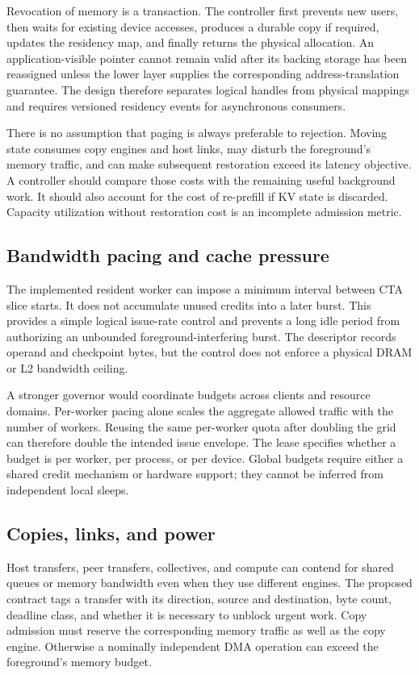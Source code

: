 Revocation of memory is a transaction. The controller first prevents new
users, then waits for existing device accesses, produces a durable copy if
required, updates the residency map, and finally returns the physical
allocation. An application-visible pointer cannot remain valid after its
backing storage has been reassigned unless the lower layer supplies the
corresponding address-translation guarantee. The design therefore separates
logical handles from physical mappings and requires versioned residency
events for asynchronous consumers.

There is no assumption that paging is always preferable to rejection. Moving
state consumes copy engines and host links, may disturb the foreground's
memory traffic, and can make subsequent restoration exceed its latency
objective. A controller should compare those costs with the remaining useful
background work. It should also account for the cost of re-prefill if KV
state is discarded. Capacity utilization without restoration cost is an
incomplete admission metric.

\subsection{Bandwidth pacing and cache pressure}
The implemented resident worker can impose a minimum interval between CTA
slice starts. It does not accumulate unused credits into a later burst. This
provides a simple logical issue-rate control and prevents a long idle period
from authorizing an unbounded foreground-interfering burst. The descriptor
records operand and checkpoint bytes, but the control does not enforce a
physical DRAM or L2 bandwidth ceiling.

A stronger governor would coordinate budgets across clients and resource
domains. Per-worker pacing alone scales the aggregate allowed traffic with
the number of workers. Reusing the same per-worker quota after doubling the
grid can therefore double the intended issue envelope. The lease specifies
whether a budget is per worker, per process, or per device. Global budgets
require either a shared credit mechanism or hardware support; they cannot
be inferred from independent local sleeps.

\subsection{Copies, links, and power}
Host transfers, peer transfers, collectives, and compute can contend for
shared queues or memory bandwidth even when they use different engines.
The proposed contract tags a transfer with its direction, source and
destination, byte count, deadline class, and whether it is necessary to
unblock urgent work. Copy admission must reserve the corresponding memory
traffic as well as the copy engine. Otherwise a nominally independent DMA
operation can exceed the foreground's memory budget.

